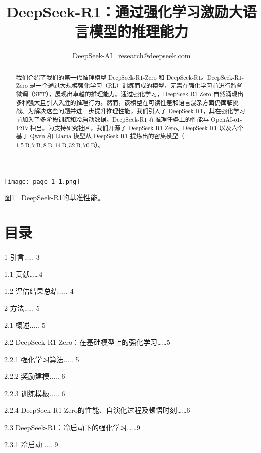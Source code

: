 \documentclass[12pt,a4paper]{report} %
\begin{document}
\title{DeepSeek-R1：通过强化学习激励大语言模型的推理能力}


\author{DeepSeek-AI \ research@deepseek.com}


\maketitle
\begin{abstract}


我们介绍了我们的第一代推理模型 DeepSeek-R1-Zero 和 DeepSeek-R1。DeepSeek-R1-Zero 是一个通过大规模强化学习（RL）训练而成的模型，无需在强化学习前进行监督微调（SFT），展现出卓越的推理能力。通过强化学习，DeepSeek-R1-Zero 自然涌现出多种强大且引人入胜的推理行为。然而，该模型在可读性差和语言混杂方面仍面临挑战。为解决这些问题并进一步提升推理性能，我们引入了 DeepSeek-R1，其在强化学习前加入了多阶段训练和冷启动数据。DeepSeek-R1 在推理任务上的性能与 OpenAI-o1-1217 相当。为支持研究社区，我们开源了 DeepSeek-R1-Zero、DeepSeek-R1 以及六个基于 Qwen 和 Llama 模型从 DeepSeek-R1 提炼出的密集模型（$1.5 \mathrm{~B}, 7 \mathrm{~B}, 8 \mathrm{~B}, 14 \mathrm{~B}, 32 \mathrm{~B}, 70 \mathrm{~B}$）。\end{abstract}


\begin{center}
\texttt{[image: page\_1\_1.png]}
\end{center}
\begin{center}


图1 | DeepSeek-R1的基准性能。


\end{center}
\section*{目录}


1 引言..... 3


1.1 贡献……4


1.2 评估结果总结..... 4


2 方法..... 5


2.1 概述..... 5


2.2 DeepSeek-R1-Zero：在基础模型上的强化学习……5


2.2.1 强化学习算法..... 5


2.2.2 奖励建模..... 6


2.2.3 训练模板..... 6


2.2.4 DeepSeek-R1-Zero的性能、自演化过程及顿悟时刻……6


2.3 DeepSeek-R1：冷启动下的强化学习……9


2.3.1 冷启动..... 9
\end{document}
